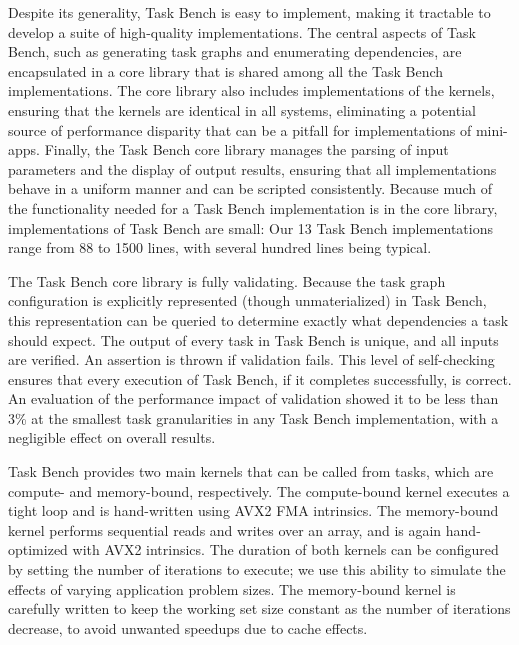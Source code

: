 Despite its generality, Task Bench is easy to implement, making it
tractable to develop a suite of high-quality implementations. The central aspects of Task Bench, such as generating
task graphs and enumerating dependencies, are encapsulated in a core
library that is shared among all the Task Bench implementations. The
core library also includes implementations of the kernels, ensuring
that the kernels are identical in all systems, eliminating a potential
source of performance disparity that can be a pitfall for
implementations of mini-apps. Finally, the Task Bench core library manages the
parsing of input parameters and the display of output results,
ensuring that all implementations behave in a uniform manner and can
be scripted consistently. Because much of the functionality needed for
a Task Bench implementation is in the core library, implementations of
Task Bench are small: Our 13 Task Bench implementations range from 88
to 1500 lines, with several hundred lines being typical.

The Task Bench core library is fully
validating. Because the task graph configuration is explicitly
represented (though unmaterialized) in Task Bench, this representation
can be queried to determine exactly what dependencies a task should
expect. The output of every task in Task Bench is unique,
and all inputs are verified. An assertion is thrown if validation
fails. This level of self-checking ensures that every execution of Task Bench, if it
completes successfully, is correct. An evaluation of the performance impact of
validation showed it to be less than 3\% at the smallest task
granularities in any Task Bench implementation, with a negligible
effect on overall results.

Task Bench provides two main kernels that can be called from tasks,
which are compute- and memory-bound, respectively. The compute-bound
kernel executes a tight loop and is hand-written using AVX2 FMA
intrinsics. The memory-bound kernel performs sequential reads and
writes over an array, and is again hand-optimized with AVX2
intrinsics. The duration of both kernels can be configured by setting
the number of iterations to execute; we use this ability to simulate
the effects of varying application problem sizes. The memory-bound
kernel is carefully written to keep the working set size constant as
the number of iterations decrease, to avoid unwanted speedups due to
cache effects.
